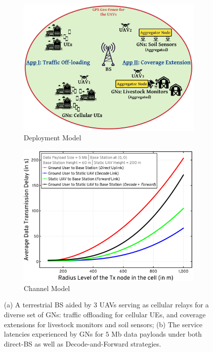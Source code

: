 \documentclass[10pt, twocolumn]{IEEEtran}
\theoremstyle{plain}
\theoremstyle{definition}
\theoremstyle{remark}
\begin{document}
\begin{figure} [t]
     \begin{subfigure}{0.505\linewidth}
         \centering
         \includegraphics[width=0.9\linewidth]{figs/Deployment_Model.png}
         \caption{Deployment Model}
         \label{F1}
     \end{subfigure}
     \begin{subfigure}{0.495\linewidth}
         \centering
         \includegraphics[width=0.9\linewidth]{figs/Channel_Model.png}
         \caption{Channel Model}
         \label{F2}
     \end{subfigure}
     \caption{(a) A terrestrial BS aided by $3$ UAVs serving as cellular relays for a diverse set of GNs: traffic offloading for cellular UEs, and coverage extensions for livestock monitors and soil sensors; (b) The service latencies experienced by GNs for $5$ Mb data payloads under both direct-BS as well as Decode-and-Forward strategies.}
     \label{F1andF2}
     \vspace{-6mm}
\end{figure}
\end{document}
